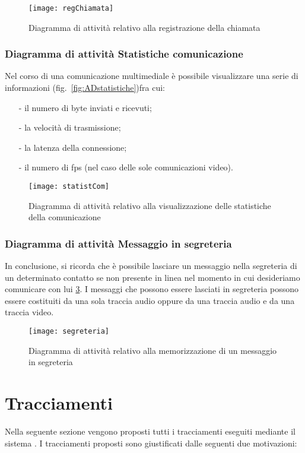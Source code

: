 \begin{figure}[H]
  \centering
  \texttt{[image: regChiamata]}
  \caption{Diagramma di attività relativo alla registrazione della chiamata}\label{fig:ADregistrachiamata}
\end{figure}

\subsubsection{Diagramma di attività Statistiche comunicazione}
Nel corso di una comunicazione multimediale è possibile visualizzare una serie di informazioni (fig.~\vref{fig:ADstatistiche})fra cui:
\begin{itemize}[noitemsep,nolistsep]
  \item[-] il numero di byte inviati e ricevuti;
  \item[-] la velocità di trasmissione;
  \item[-] la latenza della connessione;
  \item[-] il numero di fps (nel caso delle sole comunicazioni video).
\end{itemize}

\begin{figure}[H]
  \centering
  \texttt{[image: statistCom]}
  \caption{Diagramma di attività relativo alla visualizzazione delle statistiche della comunicazione}\label{fig:ADstatistiche}
\end{figure}

\subsubsection{Diagramma di attività Messaggio in segreteria}
In conclusione, si ricorda che è possibile lasciare un messaggio nella segreteria di un determinato contatto se non presente in linea nel momento in cui desideriamo comunicare con lui \ref{fig:ADmessegreteria}. I messaggi che possono essere lasciati in segreteria possono essere costituiti da una sola traccia audio oppure da una traccia audio e da una traccia video.

\begin{figure}[H]
  \centering
  \texttt{[image: segreteria]}
  \caption{Diagramma di attività relativo alla memorizzazione di un messaggio in segreteria}\label{fig:ADmessegreteria}
\end{figure}
\clearpage

\section{Tracciamenti}\label{sec:tracciamenti}
Nella seguente sezione vengono proposti tutti i tracciamenti eseguiti mediante il sistema \manager. I tracciamenti proposti sono giustificati dalle seguenti due motivazioni:

